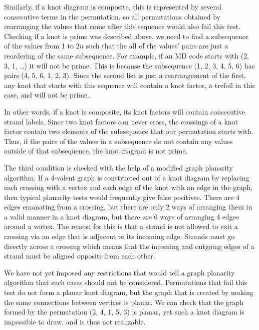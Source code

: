 \begin{paper}
Similarly, if a knot diagram is composite, this is represented by several
consecutive terms in the permutation, so all permutations obtained by
rearranging the values that come after this sequence would also fail this test.
Checking if a knot is prime was described above, we need to find a subsequence
of the values from 1 to $2n$ such that the all of the values' pairs are just a
reordering of the same subsequence.
For example, if an MD code starts with (2, 3, 1, \dots) it will not be prime.
This is because the subsequence (1, 2, 3, 4, 5, 6) has pairs (4, 5, 6, 1, 2, 3).
Since the second list is just a rearrangement of the first, any knot that starts
with this sequence will contain a knot factor, a trefoil in this case, and will
not be prime.

In other words, if a knot is composite, its knot factors will contain
consecutive strand labels.
Since two knot factors can never cross, the crossings of a knot factor contain
two elements of the subsequence that our permutation starts with.
Thus, if the pairs of the values in a subsequence do not contain any values
outside of that subsequence, the knot diagram is not prime.

The third condition is checked with the help of a modified graph planarity
algorithm.
If a 4-valent graph is constructed out of a knot diagram by replacing each
crossing with a vertex and each edge of the knot with an edge in the graph, then
typical planarity tests would frequently give false positives.
There are 4 edges emanating from a crossing, but there are only 2 ways of
arranging them in a valid manner in a knot diagram, but there are 6 ways of
arranging 4 edges around a vertex.
The reason for this is that a strand is not allowed to exit a crossing via an
edge that is adjacent to its incoming edge.
Strands must go directly across a crossing which means that the incoming and
outgoing edges of a strand must be aligned opposite from each other.

We have not yet imposed any restrictions that would tell a graph planarity
algorithm that such cases should not be considered.
Permutations that fail this test do not form a planar knot diagram, but the
graph that is created by making the same connections between vertices is
planar.
We can check that the graph formed by the permutation (2, 4, 1, 5, 3) is planar,
yet such a knot diagram is impossible to draw, and is thus not realizable.


\end{paper}
